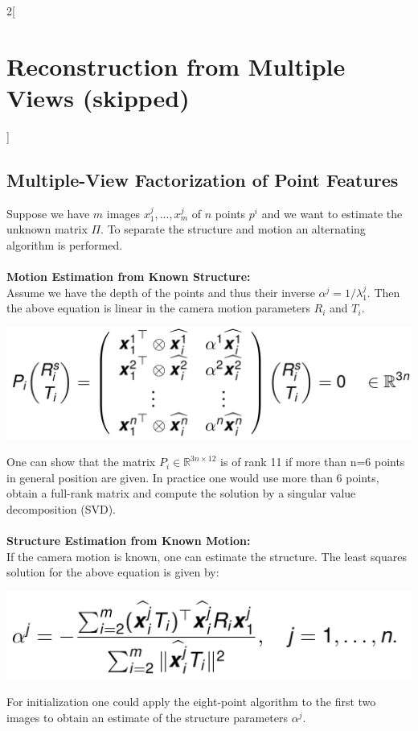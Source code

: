 \documentclass[oneside,fontsize=11pt,paper=a4]{scrartcl}
\begin{document}
\begin{multicols}{2}[\section{Reconstruction from Multiple Views (skipped)}]
\subsection{Multiple-View Factorization of Point Features}
Suppose we have $m$ images $x^j_1 , ... , x^j_m $ of $n$ points $p^i$ and we want to estimate the unknown matrix $\Pi$. To separate the structure and motion an alternating algorithm is performed. 
\\
\\
\textbf{Motion Estimation from Known Structure:} \\
Assume we have the depth of the points and thus their inverse $\alpha^j  = 1/\lambda^j_1$. Then the above equation is linear in the camera motion parameters $R_i$ and $T_i$. 
\begin{center}
    \includegraphics[width=1\linewidth]{Images/Pi.png}
\end{center}
One can show that the matrix $P_i \in \mathbb{R}^{3n \times 12}$ is of rank 11 if more than n=6 points in general position are given. In practice one would use more than 6 points, obtain a full-rank matrix and compute the solution by a singular value decomposition (SVD).
\\
\\
\textbf{Structure Estimation from Known Motion:} \\
If the camera motion is known, one can estimate the structure. The least squares solution for the above equation is given by: 
\begin{center}
    \includegraphics[width=1\linewidth]{Images/alpha.png}
\end{center}
For initialization one could apply the eight-point algorithm to
the first two images to obtain an estimate of the structure
parameters $\alpha^j$.

\end{multicols}
\end{document}
